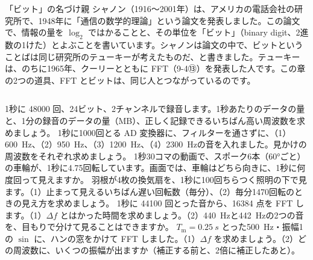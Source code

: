 
\begin{column}{「ビット」の名づけ親}
シャノン（1916〜2001年）は、アメリカの電話会社の研究所で、1948年に「通信の数学的理論」という論文を発表しました。この論文で、情報の量を $\log_2$ ではかることと、その単位を「ビット」（binary digit、2進数の1けた）とよぶことを書いています。シャノンは論文の中で、ビットということばは同じ研究所のテューキーが考えたものだ、と書きました。テューキーは、のちに1965年、クーリーとともに FFT（9-4⑬）を発表した人です。この章の2つの道具、FFT とビットは、同じ人とつながっているのです。
\end{column}

\bkendproblems
{}
\bkproblem 1秒に \num{48000} 回、24ビット、2チャンネルで録音します。1秒あたりのデータの量と、1分の録音のデータの量（MB）、正しく記録できるいちばん高い周波数を求めましょう。
\bkproblem 1秒に1000回とる AD 変換器に、フィルターを通さずに、（1）\qty{600}{Hz}、（2）\qty{950}{Hz}、（3）\qty{1200}{Hz}、（4）\qty{2300}{Hz}の音を入れました。見かけの周波数をそれぞれ求めましょう。
\bkproblem 1秒30コマの動画で、スポーク6本（\ang{60}ごと）の車輪が、1秒に4.75回転しています。画面では、車輪はどちら向きに、1秒に何度回って見えますか。
\bkproblem 羽根が4枚の換気扇を、1秒に100回ちらつく照明の下で見ます。（1）止まって見えるいちばん遅い回転数（毎分）、（2）毎分1470回転のときの見え方を求めましょう。
\bkproblem 1秒に \num{44100} 回とった音から、\num{16384} 点を FFT します。（1）$\Delta f$ とはかった時間を求めましょう。（2）\qty{440}{Hz}と\qty{442}{Hz}の2つの音を、目もりで分けて見ることはできますか。
\bkproblem $T_{\mathrm m}=\qty{0.25}{s}$ とった\qty{500}{Hz}・振幅1の $\sin$ に、ハンの窓をかけて FFT しました。（1）$\Delta f$ を求めましょう。（2）どの周波数に、いくつの振幅が出ますか（補正する前と、2倍に補正したあと）。

